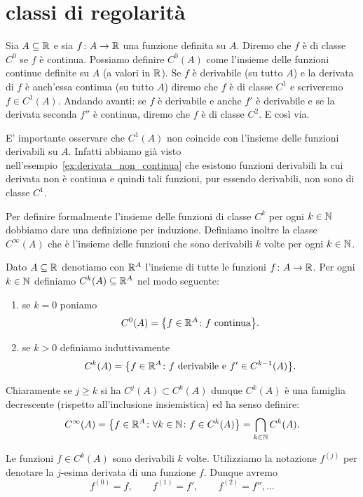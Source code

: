 \section{classi di regolarità}

Sia $A\subseteq {\mathbb R}$ e sia $f\colon A\to {\mathbb R}$ una funzione definita su $A$.
Diremo che $f$ è di classe $C^0$ se $f$ è continua. 
Possiamo definire $C^0(A)$ come l'insieme delle funzioni continue definite 
su $A$ (a valori in ${\mathbb R}$).
Se $f$ è derivabile (su tutto $A$) e la derivata di $f$ è anch'essa continua 
(su tutto $A$) diremo che 
$f$ è di classe $C^1$ e scriveremo $f\in C^1(A)$.
Andando avanti: se $f$ è derivabile e anche $f'$ è derivabile e se la derivata 
seconda $f''$ è continua, diremo che $f$ è di classe $C^2$. 
E così via.

E' importante osservare che $C^1(A)$ non coincide con l'insieme delle funzioni 
derivabili su $A$. 
Infatti abbiamo già visto nell'esempio~\ref{ex:derivata_non_continua} 
che esistono funzioni derivabili la cui derivata non è continua 
e quindi tali funzioni, pur essendo derivabili, non sono di classe $C^1$.


Per definire formalmente l'insieme delle funzioni di classe $C^k$ 
per ogni $k\in {\mathbb N}$ dobbiamo dare una definizione per induzione.
Definiamo inoltre la classe $C^{\infty}(A)$ che è l'insieme delle funzioni 
che sono derivabili $k$ volte per ogni $k\in {\mathbb N}$.
%
\begin{definition}
\mymark{**}
Dato $A\subseteq {\mathbb R}$ denotiamo con ${\mathbb R}^A$ l'insieme di tutte le funzioni $f\colon A \to {\mathbb R}$.
Per ogni $k\in {\mathbb N}$ definiamo
$C^k(A) \subseteq {\mathbb R}^A$ nel modo seguente:
%
\begin{enumerate}
\item se $k=0$ poniamo
\[
  C^0(A) = {\left\{ f\in {\mathbb R}^A \colon \text{$f$ continua} \right\}}.
\]
\item
  se $k>0$ definiamo induttivamente
  \[
  C^{k}(A) = {\left\{ f\in {\mathbb R}^A \colon \text{$f$ derivabile e $f'\in C^{k-1}(A)$} \right\}}.
  \]
\end{enumerate}
Chiaramente se $j\ge k$ si ha $C^j(A) \subset C^k(A)$ dunque $C^k(A)$ è una famiglia decrescente (rispetto all'inclusione insiemistica) ed ha senso definire:
%
\[
  C^\infty(A) = {\left\{ f\in {\mathbb R}^A\colon \forall k \in {\mathbb N}\colon f\in C^k(A) \right\}} = \bigcap_{k\in {\mathbb N}} C^k(A).
\]

Le funzioni $f\in C^k(A)$ sono derivabili $k$ volte.
Utilizziamo la notazione $f^{(j)}$%
%
 per denotare la $j$-esima derivata
di una funzione $f$.
Dunque avremo
\[
  f^{(0)} = f, \qquad
  f^{(1)} = f', \qquad
  f^{(2)} = f'', \dots
\]
\end{definition}

